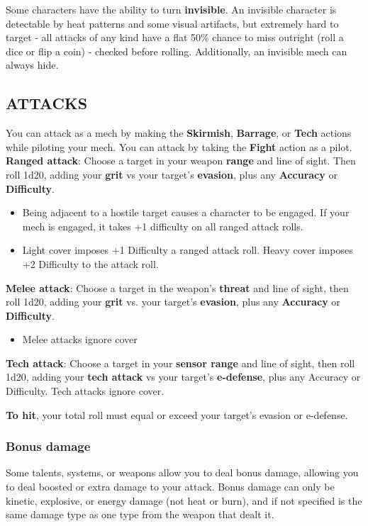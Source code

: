 Some characters have the ability to turn \textbf{invisible}. An invisible character is detectable by heat patterns and some visual artifacts, but extremely hard to target - all attacks of any kind have a flat 50\% chance to miss outright (roll a dice or flip a coin) - checked before rolling. Additionally, an invisible mech can always hide.


\subsection{ATTACKS}
You can attack as a mech by making the \textbf{Skirmish}, \textbf{Barrage}, or \textbf{Tech} actions while piloting your mech. You can attack by taking the \textbf{Fight} action as a pilot.\\
\textbf{Ranged attack}: Choose a target in your weapon \textbf{range} and line of sight. Then roll 1d20, adding your \textbf{grit} vs your target’s \textbf{evasion}, plus any \textbf{Accuracy} or \textbf{Difficulty}.
\begin{itemize}
     \item Being adjacent to a hostile target causes a character to be engaged. If your mech is engaged, it takes +1 difficulty on all ranged attack rolls.
     \item Light cover imposes +1 Difficulty a ranged attack roll. Heavy cover imposes +2 Difficulty to the attack roll.
\end{itemize}
\textbf{Melee attack}: Choose a target in the weapon’s \textbf{threat} and line of sight, then roll 1d20, adding your \textbf{grit} vs. your target’s \textbf{evasion}, plus any \textbf{Accuracy} or \textbf{Difficulty}.
\begin{itemize}
     \item Melee attacks ignore cover
\end{itemize}
\textbf{Tech attack}: Choose a target in your \textbf{sensor range} and line of sight, then roll 1d20, adding your \textbf{tech attack} vs your target’s \textbf{e-defense}, plus any Accuracy or Difficulty. Tech attacks ignore cover.

\textbf{To hit}, your total roll must equal or exceed your target’s evasion or e-defense.


\subsubsection{Bonus damage}
Some talents, systems, or weapons allow you to deal bonus damage, allowing you to deal boosted or extra damage to your attack. Bonus damage can only be kinetic, explosive, or energy damage (not heat or burn), and if not specified is the same damage type as one type from the weapon that dealt it.

